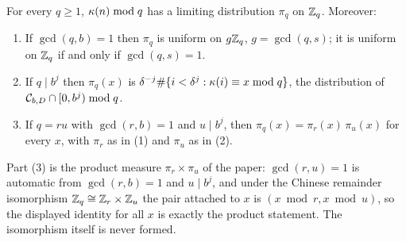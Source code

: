 \begin{lemma}[Lemma 5.3]
  \label{lem:Allq}
  \leanok
  For every $q \geq 1$, $\kappa(n) \bmod q$ has a limiting distribution $\pi_q$
  on $\mathbb{Z}_q$. Moreover:
  \begin{enumerate}
    \item If $\gcd(q,b) = 1$ then $\pi_q$ is uniform on $g\mathbb{Z}_q$,
      $g = \gcd(q,s)$; it is uniform on $\mathbb{Z}_q$ if and only if $\gcd(q,s)=1$.
    \item If $q \mid b^j$ then $\pi_q(x)$ is
      $\delta^{-j}\#\{i < \delta^j : \kappa(i) \equiv x \bmod q\}$, the
      distribution of $\mathcal{C}_{b,D} \cap [0,b^j) \bmod q$.
    \item If $q = ru$ with $\gcd(r,b) = 1$ and $u \mid b^j$, then
      $\pi_q(x) = \pi_r(x)\,\pi_u(x)$ for every $x$, with $\pi_r$ as in (1) and
      $\pi_u$ as in (2).
  \end{enumerate}
  Part (3) is the product measure $\pi_r \times \pi_u$ of the paper: $\gcd(r,u)
  = 1$ is automatic from $\gcd(r,b)=1$ and $u \mid b^j$, and under the Chinese
  remainder isomorphism $\mathbb{Z}_q \cong \mathbb{Z}_r \times \mathbb{Z}_u$ the pair attached to $x$
  is $(x \bmod r, x \bmod u)$, so the displayed identity for all $x$ is exactly
  the product statement. The isomorphism itself is never formed.
\end{lemma}

